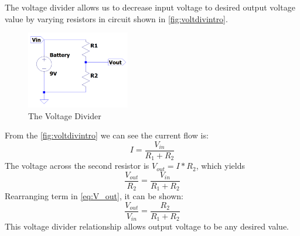 \noindent
The voltage divider allows us to decrease input voltage to desired output voltage value by varying resistors in circuit shown in  \autoref{fig:voltdivintro}.
\begin{figure}[h]
\centering
\includegraphics[width=0.4\textwidth]{voltdiv.png}
\caption{The Voltage Divider}
\label{fig:voltdivintro}
\end{figure}\newline
From the  \autoref{fig:voltdivintro} we can see the current flow is:
\begin{equation}
    {I} = \frac{{V_{in}}}{R_1 + R_2}
    \label{eq:current}
\end{equation}{}
The voltage across the second resistor is $V_{out} = I * R_2$, which yields
\begin{equation}
   \frac{{V_{out}}} {R_2} = \frac{{V_{in}}}{R_1 + R_2}
    \label{eq:V_out}
\end{equation}{}
Rearranging term in \autoref{eq:V_out}, it can be shown:
\begin{equation}
    \frac{V_{out}}{V_{in}} = \frac{R_2}{R_1 + R_2}
    \label{eq:voltdiv}
\end{equation}{}
This voltage divider relationship allows output voltage to be any desired value.\citep{meyer}
